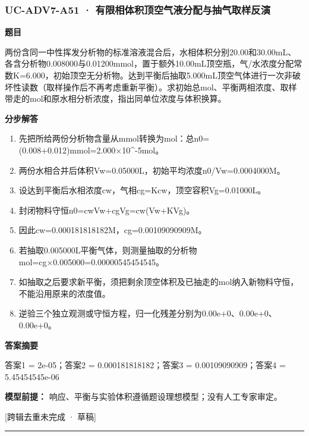 \documentclass[UTF8,11pt,a4paper]{ctexart}
\begin{document}
\subsubsection*{UC-ADV7-A51 · 有限相体积顶空气液分配与抽气取样反演}
\noindent\textbf{题目}\par
两份含同一中性挥发分析物的标准溶液混合后，水相体积分别20.00和30.00mL、各含分析物0.008000与0.01200mmol，置于额外10.00mL顶空瓶，气/水浓度分配常数K=6.000，初始顶空无分析物。达到平衡后抽取5.000mL顶空气体进行一次非破坏性读数（取样操作后不再考虑重新平衡）。求初始总mol、平衡两相浓度、取样带走的mol和原水相分析浓度，指出同单位浓度与体积换算。\par
\medskip\noindent\textbf{分步解答}
\begin{enumerate}
\item 先把所给两份分析物含量从mmol转换为mol：总n0=(0.008+0.012)mmol=2.000×10\textasciicircum{}-5mol。
\item 两份水相合并后体积Vw=0.05000L，初始平均浓度n0/Vw=0.0004000M。
\item 设达到平衡后水相浓度cw，气相cg=Kcw，顶空容积Vg=0.01000L。
\item 封闭物料守恒n0=cwVw+cgVg=cw(Vw+KVg)。
\item 因此cw=0.000181818182M，cg=0.00109090909M。
\item 若抽取0.005000L平衡气体，则测量抽取的分析物mol=cg×0.005000=0.00000545454545。
\item 如抽取之后要求新平衡，须把剩余顶空体积及已抽走的mol纳入新物料守恒，不能沿用原来的浓度值。
\item 逆验三个独立观测或守恒方程，归一化残差分别为0.00e+0、0.00e+0、0.00e+0。
\end{enumerate}
\noindent\textbf{答案摘要}\par
答案1 = 2e-05；答案2 = 0.000181818182；答案3 = 0.00109090909；答案4 = 5.45454545e-06\par
\noindent\textbf{模型前提：}
响应、平衡与实验体积遵循题设理想模型；没有人工专家审定。\par
\noindent\textcolor{red!65!black}{[跨辑去重未完成 · 草稿]} \par
\medskip\hrule\medskip
{}
\end{document}
